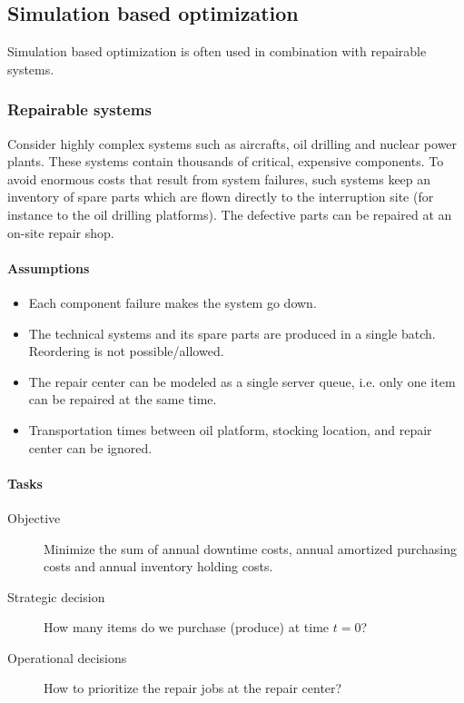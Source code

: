 \subsection{Simulation based optimization}

Simulation based optimization is often used in combination with repairable
systems.

\subsubsection{Repairable systems}
Consider highly complex systems such as aircrafts, oil drilling and nuclear
power plants. These systems contain thousands of critical, expensive
components. To avoid enormous costs that result from system failures,
such systems keep an inventory of spare parts which are flown directly to
the interruption site (for instance to the oil drilling platforms). The defective
parts can be repaired at an on-site repair shop.

\paragraph{Assumptions}

\begin{itemize}
	\tightlist
	\item Each component failure makes the system go down.
	\item The technical systems and its spare parts are produced in a single
	batch. Reordering is not possible/allowed.
	\item The repair center can be modeled as a single server queue, i.e. only
	one item can be repaired at the same time.
	\item Transportation times between oil platform, stocking location, and repair
	center can be ignored.
\end{itemize}

\paragraph{Tasks}
\begin{description}
	\item[Objective] Minimize the sum of annual downtime costs, annual amortized
	purchasing costs and annual inventory holding costs.
	\item[Strategic decision] How many items do we purchase (produce) at time
	$t = 0$?
	\item[Operational decisions] How to prioritize the repair jobs at the repair
	center?
\end{description}

